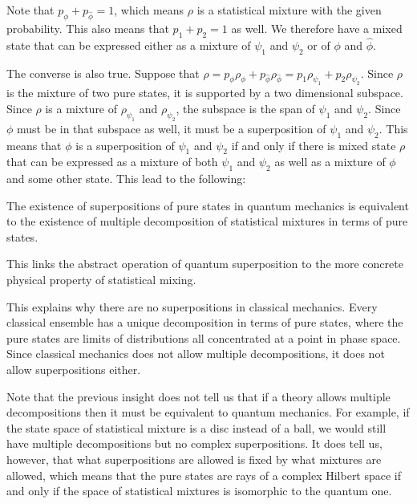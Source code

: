 Note that $p_{\phi} + p_{\hat{\phi}}=1$, which means $\rho$ is a statistical mixture with the given probability. This also means that $p_1 + p_2 = 1$ as well. We therefore have a mixed state that can be expressed either as a mixture of $\psi_1$ and $\psi_2$ or of $\phi$ and $\hat{\phi}$.

The converse is also true. Suppose that $\rho = p_{\phi} \rho_{\phi} + p_{\hat{\phi}} \rho_{\hat{\phi}} = p_{1} \rho_{\psi_1} + p_{2} \rho_{\psi_2}$. Since $\rho$ is the mixture of two pure states, it is supported by a two dimensional subspace. Since $\rho$ is a mixture of $\rho_{\psi_1}$ and $\rho_{\psi_2}$, the subspace is the span of $\psi_1$ and $\psi_2$. Since $\phi$ must be in that subspace as well, it must be a superposition of $\psi_1$ and $\psi_2$. This means that $\phi$ is a superposition of $\psi_1$ and $\psi_2$ if and only if there is mixed state $\rho$ that can be expressed as a mixture of both $\psi_1$ and $\psi_2$ as well as a mixture of $\phi$ and some other state. This lead to the following:
\begin{insight}
	The existence of superpositions of pure states in quantum mechanics is equivalent to the existence of multiple decomposition of statistical mixtures in terms of pure states.
\end{insight}
This links the abstract operation of quantum superposition to the more concrete physical property of statistical mixing.

This explains why there are no superpositions in classical mechanics. Every classical ensemble has a unique decomposition in terms of pure states, where the pure states are limits of distributions all concentrated at a point in phase space. Since classical mechanics does not allow multiple decompositions, it does not allow superpositions either.

Note that the previous insight does not tell us that if a theory allows multiple decompositions then it must be equivalent to quantum mechanics. For example, if the state space of statistical mixture is a disc instead of a ball, we would still have multiple decompositions but no complex superpositions. It does tell us, however, that what superpositions are allowed is fixed by what mixtures are allowed, which means that the pure states are rays of a complex Hilbert space if and only if the space of statistical mixtures is isomorphic to the quantum one.

